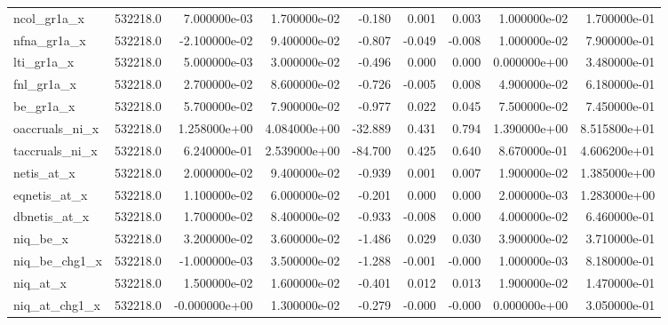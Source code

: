 \documentclass[12pt]{article}
\begin{document}
{\begin{landscape}
\begin{longtable}{|l|r|r|r|r|r|r|r|r|}
ncol\_gr1a\_x            &  532218.0 &  7.000000e-03 &  1.700000e-02 &      -0.180 &        0.001 &        0.003 &  1.000000e-02 &  1.700000e-01 \\
nfna\_gr1a\_x            &  532218.0 & -2.100000e-02 &  9.400000e-02 &      -0.807 &       -0.049 &       -0.008 &  1.000000e-02 &  7.900000e-01 \\
lti\_gr1a\_x             &  532218.0 &  5.000000e-03 &  3.000000e-02 &      -0.496 &        0.000 &        0.000 &  0.000000e+00 &  3.480000e-01 \\
fnl\_gr1a\_x             &  532218.0 &  2.700000e-02 &  8.600000e-02 &      -0.726 &       -0.005 &        0.008 &  4.900000e-02 &  6.180000e-01 \\
be\_gr1a\_x              &  532218.0 &  5.700000e-02 &  7.900000e-02 &      -0.977 &        0.022 &        0.045 &  7.500000e-02 &  7.450000e-01 \\
oaccruals\_ni\_x         &  532218.0 &  1.258000e+00 &  4.084000e+00 &     -32.889 &        0.431 &        0.794 &  1.390000e+00 &  8.515800e+01 \\
taccruals\_ni\_x         &  532218.0 &  6.240000e-01 &  2.539000e+00 &     -84.700 &        0.425 &        0.640 &  8.670000e-01 &  4.606200e+01 \\
netis\_at\_x             &  532218.0 &  2.000000e-02 &  9.400000e-02 &      -0.939 &        0.001 &        0.007 &  1.900000e-02 &  1.385000e+00 \\
eqnetis\_at\_x           &  532218.0 &  1.100000e-02 &  6.000000e-02 &      -0.201 &        0.000 &        0.000 &  2.000000e-03 &  1.283000e+00 \\
dbnetis\_at\_x           &  532218.0 &  1.700000e-02 &  8.400000e-02 &      -0.933 &       -0.008 &        0.000 &  4.000000e-02 &  6.460000e-01 \\
niq\_be\_x               &  532218.0 &  3.200000e-02 &  3.600000e-02 &      -1.486 &        0.029 &        0.030 &  3.900000e-02 &  3.710000e-01 \\
niq\_be\_chg1\_x          &  532218.0 & -1.000000e-03 &  3.500000e-02 &      -1.288 &       -0.001 &       -0.000 &  1.000000e-03 &  8.180000e-01 \\
niq\_at\_x               &  532218.0 &  1.500000e-02 &  1.600000e-02 &      -0.401 &        0.012 &        0.013 &  1.900000e-02 &  1.470000e-01 \\
niq\_at\_chg1\_x          &  532218.0 & -0.000000e+00 &  1.300000e-02 &      -0.279 &       -0.000 &       -0.000 &  0.000000e+00 &  3.050000e-01 \\

\end{longtable}
\end{landscape}}
\end{document}

